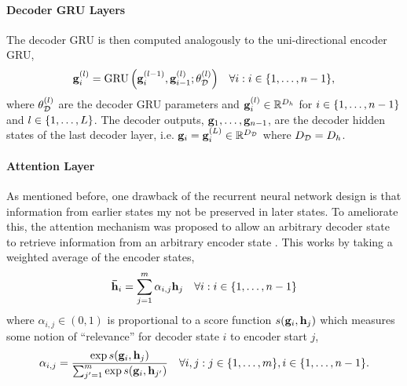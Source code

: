 \paragraph{{Decoder GRU Layers}}
The decoder GRU is then computed analogously to the uni-directional encoder GRU,
\begin{align*}
    \mathbf{g}_i^{(l)} & =\operatorname{GRU}\left(\mathbf{g}_i^{(l - 1)}, \mathbf{g}_{i-1}^{(l)}; \theta_\mathcal{D}^{(l)}\right) & \forall i : i \in \{1,\ldots, n-1\},
\end{align*}
where $\theta_\mathcal{D}^{(l)}$ are the decoder GRU parameters and
$ \mathbf{g}_i^{(l)} \in \mathbb{R}^{D_{h}}$ for $i \in \{1,\ldots,n-1\}$ and $l \in \{1,\ldots,L\}$.
The decoder outputs, $\mathbf{g}_1,\ldots,\mathbf{g}_{n-1}$, are the decoder hidden states of the last decoder layer, i.e. $\mathbf{g}_i = \mathbf{g}^{(L)}_i \in \mathbb{R}^{{D_\mathcal{D}}}$ where ${D_\mathcal{D}}=D_{h}$.

\paragraph{{Attention Layer}}

As mentioned before, one drawback of the recurrent neural network design is that information
from earlier states my not be preserved in later states. To ameliorate this, the attention
mechanism was proposed to allow an arbitrary decoder state to retrieve information from an arbitrary
encoder state \citep{bahdanau2015}. This works by taking a weighted average of the encoder states,
\begin{align*}
    {\boldsymbol{\bar{\mathbf{h}}}}_i & = \sum^{m}_{j=1}\alpha_{i,j}\mathbf{h}_j & \forall i : i \in \{1,\ldots, n-1\}
\end{align*}
where $\alpha_{i,j} \in (0,1)$ is proportional to a score function $s(\mathbf{g}_i,\mathbf{h}_j)$ which 
measures some notion of ``relevance'' for decoder state $i$ to encoder start $j$,
\[\alpha_{i,j} = \frac{\exp s(\mathbf{g}_i, \mathbf{h}_j) }{ \sum_{j^\prime=1}^{m} \exp s(\mathbf{g}_i, \mathbf{h}_{j^\prime})} \quad \forall i,j : j \in \{1,\ldots,m\}, i \in \{1,\ldots,n-1\}.\]

